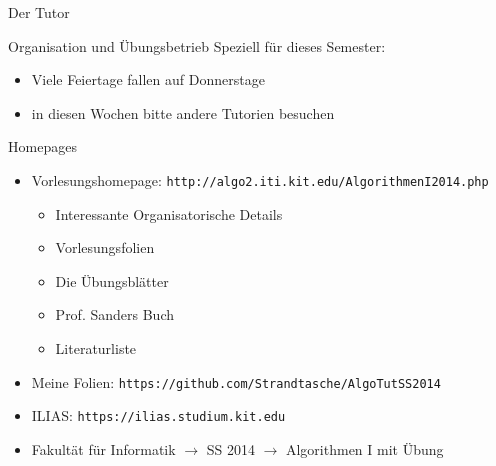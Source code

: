 \documentclass[18pt]{beamer}
\begin{document}
\begin{frame}{Der Tutor}
	\begin{frame}{Organisation und Übungsbetrieb}
		Speziell für dieses Semester:
		\begin{itemize}
			\item Viele Feiertage fallen auf Donnerstage
			\item in diesen Wochen bitte andere Tutorien besuchen 
		\end{itemize}		
	\end{frame}

	\begin{frame}{Homepages}
		\begin{itemize}
			\item Vorlesungshomepage: \texttt{http://algo2.iti.kit.edu/AlgorithmenI2014.php}
			\begin{itemize}
				\item Interessante Organisatorische Details
				\item Vorlesungsfolien
				\item Die Übungsblätter
				\item Prof. Sanders Buch
				\item Literaturliste
			\end{itemize}
			\item Meine Folien: \texttt{https://github.com/Strandtasche/AlgoTutSS2014}
			\item ILIAS: \texttt{https://ilias.studium.kit.edu}
			\item Fakultät für Informatik $\rightarrow$ SS 2014 $\rightarrow$ Algorithmen I mit Übung			
		\end{itemize}		
	\end{frame}


\end{frame}
\end{document}
